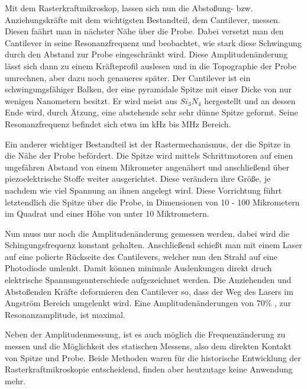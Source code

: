 Mit dem Rasterkraftmikroskop, lassen sich nun die Abstoßung- bzw. Anziehungskräfte mit dem wichtigsten Bestandteil, dem Cantilever, messen.
Diesen faährt man in nächster Nähe über die Probe.
Dabei versetzt man den Cantilever in seine Resonanzfrequenz und beobachtet, wie stark diese Schwingung durch den Abstand zur Probe eingeschränkt wird.
Diese Amplitudenänderung lässt sich dann zu einem Kräfteprofil auslesen und in die Topographie der Probe umrechnen, aber dazu noch genaueres später.
Der Cantilever ist ein schwingungsfähiger Balken, der eine pyramidale Spitze mit einer Dicke von nur wenigen Nanometern besitzt.
Er wird meist aus $Si_3N_4$ hergestellt und an dessen Ende wird, durch Ätzung, eine abstehende sehr sehr dünne Spitze geformt.
Seine Resonanzfrequenz befindet sich etwa im kHz bis MHz Bereich.
\par
Ein anderer wichtiger Bestandteil ist der Rastermechanismus, der die Spitze in die Nähe der Probe befördert. Die Spitze wird mittels Schrittmotoren auf einen ungefähren Abstand von einem Mikrometer angenähert und anschließend über piezoelektrische Stoffe weiter ausgerichtet.
Diese verändern ihre Größe, je nachdem wie viel Spannung an ihnen angelegt wird. 
Diese Vorrichtung führt letztendlich die Spitze über die Probe, in Dimensionen von 10 - 100 Mikrometern im Quadrat und einer Höhe von unter 10 Miktrometern.
\par
Nun muss nur noch die Amplitudenänderung gemessen werden, dabei wird die Schingungsfrequenz konstant gehalten. 
Anschließend schießt man mit einem Laser auf eine polierte Rückseite des Cantilevers, welcher nun den Strahl auf eine Photodiode umlenkt. 
Damit können minimale Auslenkungen direkt druch elektrische Spannungsunterschiede aufgezeichnet werden.
Die Anziehenden und Abstoßenden Kräfte deformieren den Cantilever so, dass der Weg des Lasers im Angström Bereich umgelenkt wird. 
Eine Amplitudenänderungen von 70\% , zur Resonanzamplitude, ist maximal. 
\par
Neben der Amplitudenmessung, ist es auch möglich die Frequenzänderung zu messen und die Möglichkeit des statischen Messens, also dem direkten Kontakt von Spitze und Probe.
Beide Methoden waren für die historische Entwicklung der Rasterkraftmikroskopie entscheidend, finden aber heutzutage keine Anwendung mehr.



